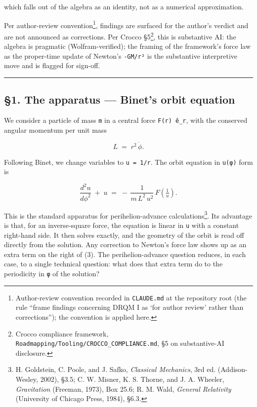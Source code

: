 \documentclass[
  11pt,
]{article}
\begin{document}
which falls out of the algebra as an identity, not as a numerical
approximation.

Per author-review convention\footnote{Author-review convention recorded
  in \texttt{CLAUDE.md} at the repository root (the rule ``frame
  findings concerning DRQM I as `for author review' rather than
  corrections''); the convention is applied here.}, findings are
surfaced for the author's verdict and are not announced as corrections.
Per Crocco §5\footnote{Crocco compliance framework,
  \texttt{Roadmapping/Tooling/CROCCO\_COMPLIANCE.md}, §5 on
  substantive-AI disclosure.}, this is substantive AI: the algebra is
pragmatic (Wolfram-verified); the framing of the framework's force law
as the proper-time update of Newton's \texttt{-GM/r²} is the substantive
interpretive move and is flagged for sign-off.

\begin{center}\rule{0.5\linewidth}{0.5pt}\end{center}

\hypertarget{the-apparatus-binets-orbit-equation}{%
\subsection{§1. The apparatus --- Binet's orbit
equation}\label{the-apparatus-binets-orbit-equation}}

We consider a particle of mass \texttt{m} in a central force
\texttt{F(r)\ ê\_r}, with the conserved angular momentum per unit mass

\[
L \;=\; r^{2}\,\dot\phi. \tag{2}
\]

Following Binet, we change variables to \texttt{u\ =\ 1/r}. The orbit
equation in \texttt{u(φ)} form is

\[
\frac{d^{2} u}{d\phi^{2}} \;+\; u
\;=\; -\,\frac{1}{m\,L^{2}\,u^{2}}\,F\!\left(\tfrac{1}{u}\right). \tag{3}
\]

This is the standard apparatus for perihelion-advance
calculations\footnote{H. Goldstein, C. Poole, and J. Safko,
  \emph{Classical Mechanics}, 3rd ed. (Addison-Wesley, 2002), §3.5; C.
  W. Misner, K. S. Thorne, and J. A. Wheeler, \emph{Gravitation}
  (Freeman, 1973), Box 25.6; R. M. Wald, \emph{General Relativity}
  (University of Chicago Press, 1984), §6.3.}. Its advantage is that,
for an inverse-square force, the equation is linear in \texttt{u} with a
constant right-hand side. It then solves exactly, and the geometry of
the orbit is read off directly from the solution. Any correction to
Newton's force law shows up as an extra term on the right of (3). The
perihelion-advance question reduces, in each case, to a single technical
question: what does that extra term do to the periodicity in \texttt{φ}
of the solution?
\end{document}
